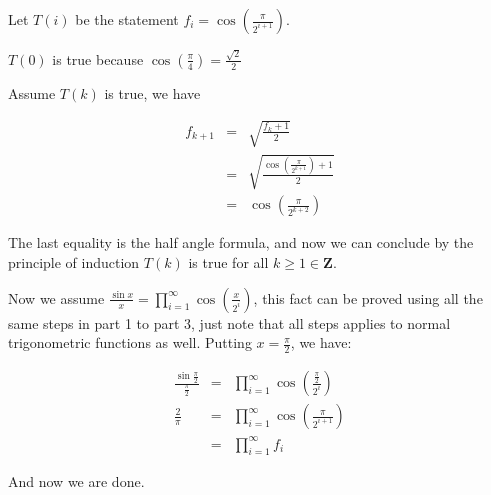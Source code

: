 \documentclass{article}
\begin{document}
Let $ T(i) $ be the statement $ f_i = \cos\left(\frac{\pi}{2^{i+1}}\right) $.

$ T(0) $ is true because $ \cos\left(\frac{\pi}{4}\right) = \frac{\sqrt{2}}{2} $

Assume $ T(k) $ is true, we have

\begin{eqnarray*}
    f_{k+1} &=& \sqrt{\frac{f_k + 1}{2}} \\
            &=& \sqrt{\frac{\cos\left(\frac{\pi}{2^{k+1}}\right) + 1}{2}} \\
            &=& \cos\left(\frac{\pi}{2^{k+2}}\right)
\end{eqnarray*}

The last equality is the half angle formula, and now we can conclude by the principle of induction $ T(k) $ is true for all $ k \ge 1 \in \mathbf{Z} $.

Now we assume $ \frac{\sin x}{x} = \prod\limits_{i = 1}^{\infty} \cos\left(\frac{x}{2^i}\right) $, this fact can be proved using all the same steps in part 1 to part 3, just note that all steps applies to normal trigonometric functions as well. Putting $ x = \frac{\pi}{2} $, we have:

\begin{eqnarray*}
    \frac{\sin\frac{\pi}{2}}{\frac{\pi}{2}} &=& \prod\limits_{i = 1}^{\infty} \cos\left(\frac{\frac{\pi}{2}}{2^i}\right) \\
                              \frac{2}{\pi} &=& \prod\limits_{i = 1}^{\infty} \cos\left(\frac{\pi}{2^{i+1}}\right) \\
                              &=& \prod\limits_{i = 1}^{\infty} f_i 
\end{eqnarray*}

And now we are done.
\end{document}
